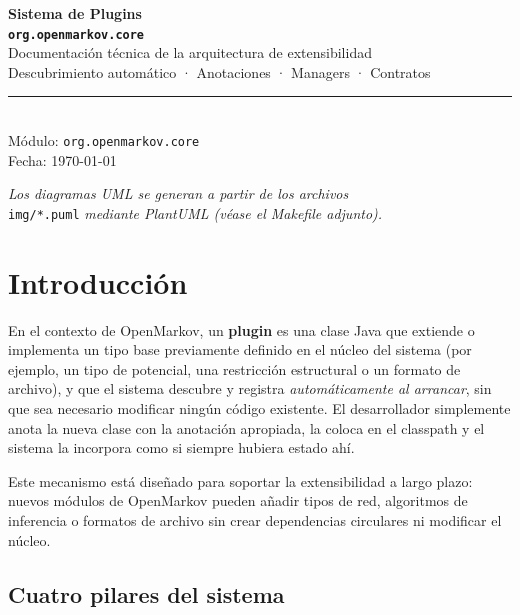 \documentclass[12pt,a4paper,spanish]{article}
\begin{document}

\begin{titlepage}
    \centering
    \vspace*{2cm}
    {\Huge\bfseries\color{azulOM} Sistema de Plugins\\[0.5em]
     \large\color{gray!80!black} \texttt{org.openmarkov.core}}\\[2cm]
    {\large Documentación técnica de la arquitectura de extensibilidad}\\[0.5em]
    {\normalsize Descubrimiento automático · Anotaciones · Managers · Contratos}\\[3cm]
    \rule{0.6\textwidth}{1pt}\\[1em]
    {\normalsize Módulo: \texttt{org.openmarkov.core}}\\
    {\normalsize Fecha: \today}
    \vfill
    \begin{center}
    \small\textit{Los diagramas UML se generan a partir de los archivos}\\
    \texttt{img/*.puml} \textit{mediante PlantUML (véase el Makefile adjunto).}
    \end{center}
\end{titlepage}

\tableofcontents
\clearpage

\section{Introducción}

En el contexto de OpenMarkov, un \textbf{plugin} es una clase Java que extiende o
implementa un tipo base previamente definido en el núcleo del sistema (por ejemplo,
un tipo de potencial, una restricción estructural o un formato de archivo), y que
el sistema descubre y registra \emph{automáticamente al arrancar}, sin que sea
necesario modificar ningún código existente. El desarrollador simplemente anota la
nueva clase con la anotación apropiada, la coloca en el classpath y el sistema la
incorpora como si siempre hubiera estado ahí.

Este mecanismo está diseñado para soportar la extensibilidad a largo plazo: nuevos
módulos de OpenMarkov pueden añadir tipos de red, algoritmos de inferencia o
formatos de archivo sin crear dependencias circulares ni modificar el núcleo.

\subsection{Cuatro pilares del sistema}
\label{sec:pilares}
\end{document}
